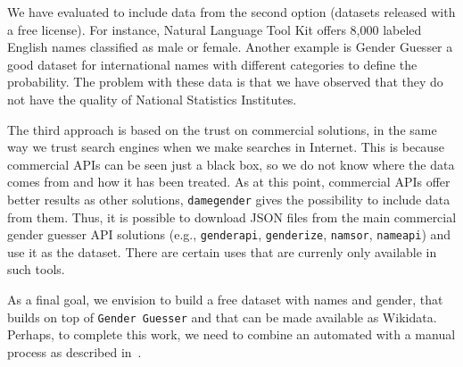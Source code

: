 \documentclass[a4paper]{article}
\begin{document}

We have evaluated to include data from the second option (datasets released with a free license). 
For instance, Natural Language Tool Kit offers 8,000 labeled English names classified as male or female. 
Another example is Gender Guesser a good dataset for international names with different categories to define the probability. 
The problem with these data is that we have observed that they do not have the quality of National Statistics Institutes. 


The third approach is based on the trust on commercial solutions, in the same way we trust search engines when we make searches in Internet.
This is because commercial APIs can be seen just a black box, so we do not know where the data comes from and how it has been treated.
As at this point, commercial APIs offer better results as other solutions, \texttt{damegender} gives the possibility to include data from them.
Thus, it is possible to download JSON files from the main commercial gender guesser API solutions (e.g., \texttt{genderapi}, \texttt{genderize}, \texttt{namsor}, \texttt{nameapi}) and use it as the dataset.
There are certain uses that are currenly only available in such tools.


As a final goal, we envision to build a free dataset with names and gender, that builds on top of \texttt{Gender Guesser} and that can be made available as Wikidata. 
Perhaps, to complete this work, we need to combine an automated with a manual process as described in~\cite{10.7717/peerj-cs.156}.
\end{document}

